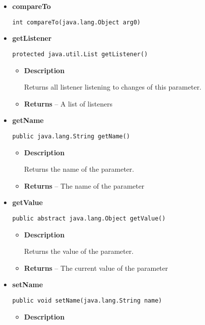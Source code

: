{{{{{{{{{{{{{\begin{itemize}
{\begin{itemize}
{Add a listener who gets triggered when a change of the value occurs.
}
\item{
{\bf  Parameters}
  \begin{itemize}
   \item{
\texttt{listener} -- The listener to add}
  \end{itemize}
}%
\end{itemize}
}%
\item{ 
{\bf  compareTo}\\
\begin{lstlisting}[frame=none]
int compareTo(java.lang.Object arg0)\end{lstlisting} %
}%
\item{ 
{\bf  getListener}\\
\begin{lstlisting}[frame=none]
protected java.util.List getListener()\end{lstlisting} %
\begin{itemize}
\item{
{\bf  Description}

Returns all listener listening to changes of this parameter.
}
\item{{\bf  Returns} -- 
A list of listeners 
}%
\end{itemize}
}%
\item{ 
{\bf  getName}\\
\begin{lstlisting}[frame=none]
public java.lang.String getName()\end{lstlisting} %
\begin{itemize}
\item{
{\bf  Description}

Returns the name of the parameter.
}
\item{{\bf  Returns} -- 
The name of the parameter 
}%
\end{itemize}
}%
\item{ 
{\bf  getValue}\\
\begin{lstlisting}[frame=none]
public abstract java.lang.Object getValue()\end{lstlisting} %
\begin{itemize}
\item{
{\bf  Description}

Returns the value of the parameter.
}
\item{{\bf  Returns} -- 
The current value of the parameter 
}%
\end{itemize}
}%
\item{ 
{\bf  setName}\\
\begin{lstlisting}[frame=none]
public void setName(java.lang.String name)\end{lstlisting} %
\begin{itemize}
\item{
{\bf  Description}

}
\end{itemize}}
\end{itemize}}}}}}}}}}}}}}
